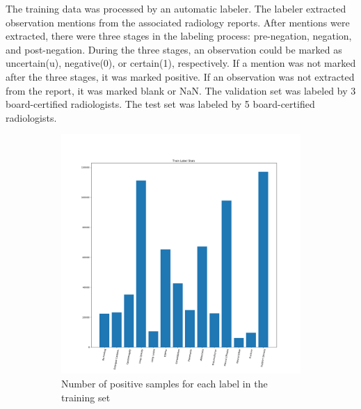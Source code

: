 \documentclass{amia}
\begin{document}
The training data was processed by an automatic labeler. The labeler extracted observation mentions from the associated radiology reports. After mentions were extracted, there were three stages in the labeling process: pre-negation, negation, and post-negation. During the three stages, an observation could be marked as uncertain(u), negative(0), or certain(1), respectively. If a mention was not marked after the three stages, it was marked positive. If an observation was not extracted from the report, it was marked blank or NaN. The validation set was labeled by 3 board-certified radiologists. The test set was labeled by 5 board-certified radiologists.



\begin{figure}[ht]
\begin{subfigure}{0.5\linewidth}
	\centering
	\includegraphics[width=\linewidth]{TrainLabelStats.png}
	\caption{Number of positive samples for each label in the training set}\label{fig:a}
\end{subfigure}
\begin{subfigure}{0.5\linewidth}
	\centering

\end{subfigure}
\end{figure}
\end{document}
